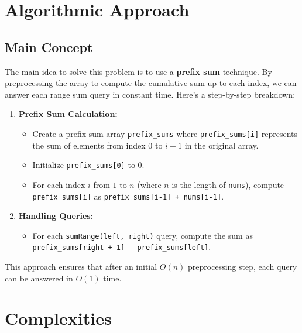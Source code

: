 \section*{Algorithmic Approach}

\subsection*{Main Concept}
The main idea to solve this problem is to use a \textbf{prefix sum} technique. By preprocessing the array to compute the cumulative sum up to each index, we can answer each range sum query in constant time. Here's a step-by-step breakdown:

\begin{enumerate}
    \item \textbf{Prefix Sum Calculation:}
    \begin{itemize}
        \item Create a prefix sum array \texttt{prefix\_sums} where \texttt{prefix\_sums[i]} represents the sum of elements from index \(0\) to \(i-1\) in the original array.
        \item Initialize \texttt{prefix\_sums[0]} to \(0\).
        \item For each index \(i\) from \(1\) to \(n\) (where \(n\) is the length of \texttt{nums}), compute \texttt{prefix\_sums[i]} as \texttt{prefix\_sums[i-1] + nums[i-1]}.
    \end{itemize}
    
    \item \textbf{Handling Queries:}
    \begin{itemize}
        \item For each \texttt{sumRange(left, right)} query, compute the sum as \texttt{prefix\_sums[right + 1] - prefix\_sums[left]}.
    \end{itemize}
\end{enumerate}

This approach ensures that after an initial \( O(n) \) preprocessing step, each query can be answered in \( O(1) \) time.


\section*{Complexities}


